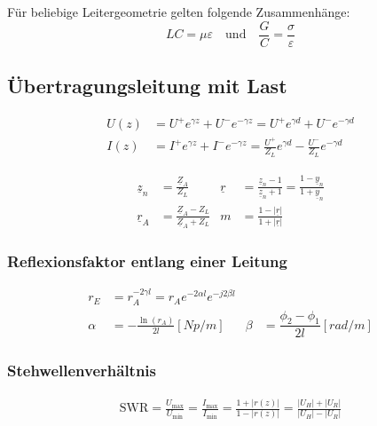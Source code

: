 \vspace{1ex}
Für beliebige Leitergeometrie gelten folgende Zusammenhänge:
\[
    LC = \mu\varepsilon \quad \text{und} \quad \frac{G}{C} = \frac{\sigma}{\varepsilon}
\]

\subsection{Übertragungsleitung mit Last}



\begin{align*}
    U(z) & = U^+ e^{\gamma z} + U^- e^{-\gamma z} = U^+ e^{\gamma d} + U^ - e^{-\gamma d}                      \\
    I(z) & = I^+ e^{\gamma z} + I^- e^{-\gamma z} = \frac{U^+}{Z_L}e^{\gamma d} - \frac{U^-}{Z_L}e^{-\gamma d}
\end{align*}

\begin{align*}
    \underline{z}_n & = \frac{\underline{Z}_A}{Z_L}                     & \underline{r} & = \frac{\underline{z}_n-1}{\underline{z}_n+1}= \frac{1-\underline{y}_n}{1+\underline{y}_n} \\
    \underline{r}_A & = \frac{\underline{Z}_A-Z_L}{\underline{Z}_A+Z_L} & m             & = \frac{1-|\underline{r}|}{1+|\underline{r}|}
\end{align*}

\subsubsection{Reflexionsfaktor entlang einer Leitung}
\begin{align*}
    r_E    & = r_A  ^{-2\gamma l} = r_A  e^{-2\alpha l} e^{-j2\beta l}                                                     \\
    \alpha & = -\frac{\ln(r_A)}{2l} [\si{Np/m}]                        & \beta & = \dfrac{\phi_2 -\phi_1}{2l} [\si{rad/m}]
\end{align*}

\subsubsection{Stehwellenverhältnis}
\begin{align*}
    \mathrm{SWR} = \frac{U_\text{max}}{U_\text{min}} =
    \frac{I_\text{max}}{I_\text{min}} = \frac{1+|r(z)|}{1-|r(z)|} =
    \frac{|U_H|+|U_R|}{|U_H|-|U_R|}
\end{align*}

